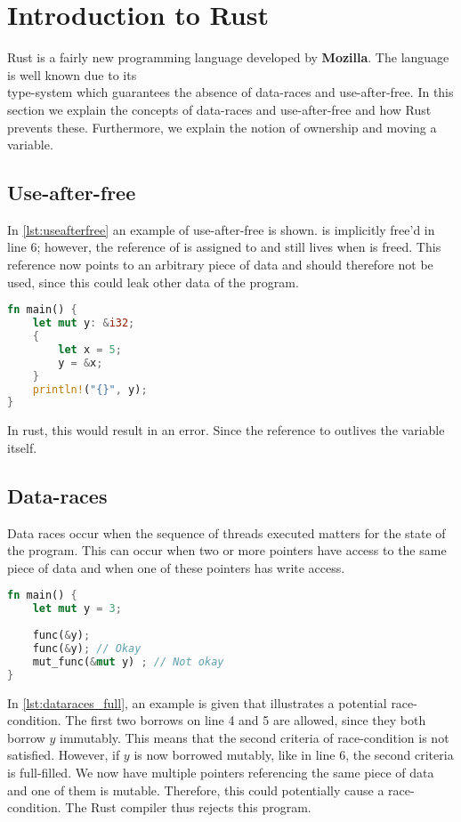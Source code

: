 \section{Introduction to Rust}\label{s:rust}
Rust is a fairly new programming language developed by \textbf{Mozilla}. The language is well known due to its\\ type-system which guarantees the absence of data-races and use-after-free. In this section we explain the concepts of data-races and use-after-free and how Rust prevents these. Furthermore, we explain the notion of ownership and moving a variable. 

\subsection{Use-after-free} 
In \autoref{lst:useafterfree} an example of use-after-free is shown.  is implicitly free'd in line 6; however, the reference of  is assigned to  and still lives when  is freed. This reference now points to an arbitrary piece of data and should therefore not be used, since this could leak other data of the program. 

 \begin{lstlisting}[language=rust, showstringspaces=false, escapechar=~, label={lst:useafterfree}, caption={Example of use-after-free}]
fn main() { 
    let mut y: &i32;
    {
        let x = 5;
        y = &x;
    }
    println!("{}", y); 
}

\end{lstlisting}
In rust, this would result in an error. Since the reference to  outlives the variable itself. 

\subsection{Data-races}
Data races occur when the sequence of threads executed matters for the state of the program. This can occur when two or more pointers have access to the same piece of data and when one of these pointers has write access. 

 \begin{lstlisting}[language=rust, showstringspaces=false, escapechar=~, label={lst:dataraces_full}, caption={Example of potential data-race}]
fn main() { 
    let mut y = 3;
    
    func(&y);
    func(&y); // Okay
    mut_func(&mut y) ; // Not okay 
}
\end{lstlisting}
In \autoref{lst:dataraces_full}, an example is given that illustrates a potential race-condition. The first two borrows on line 4 and 5 are allowed, since they both borrow $y$ immutably. This means that the second criteria of race-condition is not satisfied. However, if $y$ is now borrowed mutably, like in line 6, the second criteria is full-filled. We now have multiple pointers referencing the same piece of data and one of them is mutable. Therefore, this could potentially cause a race-condition. The Rust compiler thus rejects this program.\\

